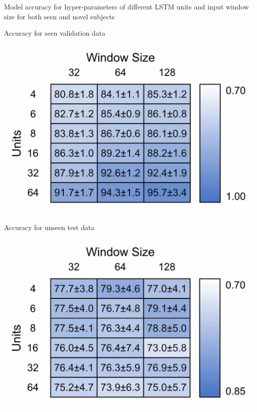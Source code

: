 \documentclass[sensors,article,submit,moreauthors,pdftex]{Definitions/mdpi}
\begin{document}
\begin{table}[!hbt]
    \centering
    \caption{Model accuracy for hyper-parameters of different LSTM units and input window size for both seen and novel subjects}
    \label{tab:model_size_hyper_param}
    \begin{subtable}{.4\linewidth}
        \centering
        \caption{Accuracy for seen validation data}
        \label{tab:model_size_hyper_param_train}
        \includegraphics[width=\textwidth]{Figures/results/window_v_units_train.jpg}
    \end{subtable}
    \hfil
    \begin{subtable}{.4\linewidth}
        \centering
        \caption{Accuracy for unseen test data}
        \label{tab:model_size_hyper_param_test}
        \includegraphics[width=\textwidth]{Figures/results/window_v_units_test.jpg}
    \end{subtable}
\end{table}
\end{document}
